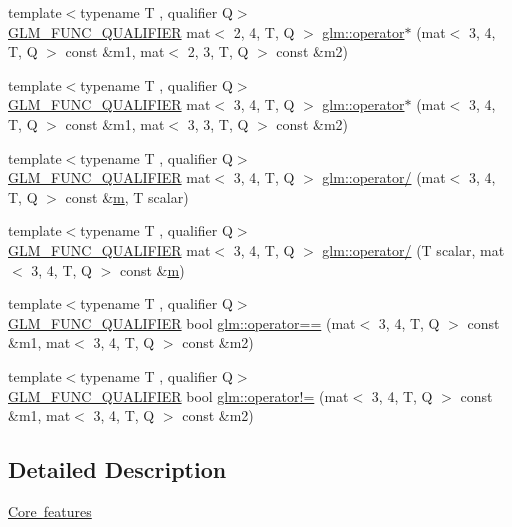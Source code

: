\begin{DoxyCompactItemize}
\item 
{\footnotesize template$<$typename T , qualifier Q$>$ }\\\mbox{\hyperlink{setup_8hpp_a33fdea6f91c5f834105f7415e2a64407}{G\+L\+M\+\_\+\+F\+U\+N\+C\+\_\+\+Q\+U\+A\+L\+I\+F\+I\+ER}} mat$<$ 2, 4, T, Q $>$ \mbox{\hyperlink{namespaceglm_a3e4a88d6df1e21560800d7dd5ccd471c}{glm\+::operator$\ast$}} (mat$<$ 3, 4, T, Q $>$ const \&m1, mat$<$ 2, 3, T, Q $>$ const \&m2)
\item 
{\footnotesize template$<$typename T , qualifier Q$>$ }\\\mbox{\hyperlink{setup_8hpp_a33fdea6f91c5f834105f7415e2a64407}{G\+L\+M\+\_\+\+F\+U\+N\+C\+\_\+\+Q\+U\+A\+L\+I\+F\+I\+ER}} mat$<$ 3, 4, T, Q $>$ \mbox{\hyperlink{namespaceglm_ac37ea54112e67cd7577cb6a1a7c6bee5}{glm\+::operator$\ast$}} (mat$<$ 3, 4, T, Q $>$ const \&m1, mat$<$ 3, 3, T, Q $>$ const \&m2)
\item 
{\footnotesize template$<$typename T , qualifier Q$>$ }\\\mbox{\hyperlink{setup_8hpp_a33fdea6f91c5f834105f7415e2a64407}{G\+L\+M\+\_\+\+F\+U\+N\+C\+\_\+\+Q\+U\+A\+L\+I\+F\+I\+ER}} mat$<$ 3, 4, T, Q $>$ \mbox{\hyperlink{namespaceglm_ac945990f829bca6745446d031f2fa5f5}{glm\+::operator/}} (mat$<$ 3, 4, T, Q $>$ const \&\mbox{\hyperlink{_s_d_l__opengl__glext_8h_af593500c283bf1a787a6f947f503a5c2}{m}}, T scalar)
\item 
{\footnotesize template$<$typename T , qualifier Q$>$ }\\\mbox{\hyperlink{setup_8hpp_a33fdea6f91c5f834105f7415e2a64407}{G\+L\+M\+\_\+\+F\+U\+N\+C\+\_\+\+Q\+U\+A\+L\+I\+F\+I\+ER}} mat$<$ 3, 4, T, Q $>$ \mbox{\hyperlink{namespaceglm_a82d79d8121288d008678655f354e8466}{glm\+::operator/}} (T scalar, mat$<$ 3, 4, T, Q $>$ const \&\mbox{\hyperlink{_s_d_l__opengl__glext_8h_af593500c283bf1a787a6f947f503a5c2}{m}})
\item 
{\footnotesize template$<$typename T , qualifier Q$>$ }\\\mbox{\hyperlink{setup_8hpp_a33fdea6f91c5f834105f7415e2a64407}{G\+L\+M\+\_\+\+F\+U\+N\+C\+\_\+\+Q\+U\+A\+L\+I\+F\+I\+ER}} bool \mbox{\hyperlink{namespaceglm_ad06d69260cdcbdeca32e7577d667b95d}{glm\+::operator==}} (mat$<$ 3, 4, T, Q $>$ const \&m1, mat$<$ 3, 4, T, Q $>$ const \&m2)
\item 
{\footnotesize template$<$typename T , qualifier Q$>$ }\\\mbox{\hyperlink{setup_8hpp_a33fdea6f91c5f834105f7415e2a64407}{G\+L\+M\+\_\+\+F\+U\+N\+C\+\_\+\+Q\+U\+A\+L\+I\+F\+I\+ER}} bool \mbox{\hyperlink{namespaceglm_aedafadf9cc6945a030e2c69bdd7e2744}{glm\+::operator!=}} (mat$<$ 3, 4, T, Q $>$ const \&m1, mat$<$ 3, 4, T, Q $>$ const \&m2)
\end{DoxyCompactItemize}


\subsection{Detailed Description}
\mbox{\hyperlink{group__core}{Core features}} 